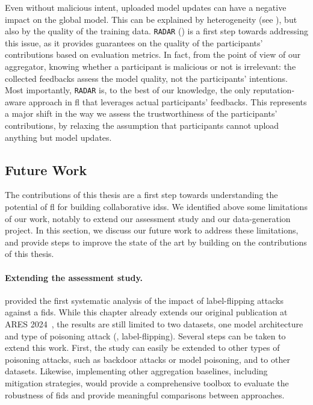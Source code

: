 \begin{itemize}[listparindent=\parindent,itemsep=.6\baselineskip]
  Even without malicious intent, uploaded model updates can have a negative impact on the global model.
  This can be explained by heterogeneity (see ), but also by the quality of the training data.
  \texttt{RADAR} () is a first step towards addressing this issue, as it provides guarantees on the quality of the participants' contributions based on evaluation metrics.
  In fact, from the point of view of our aggregator, knowing whether a participant is malicious or not is irrelevant: the collected feedbacks assess the model quality, not the participants' intentions.
  Most importantly, \texttt{RADAR} is, to the best of our knowledge, the only reputation-aware approach in \gls{fl} that leverages actual participants' feedbacks.
  This represents a major shift in the way we assess the trustworthiness of the participants' contributions, by relaxing the assumption that participants cannot upload anything but model updates.

\end{itemize}


\subsection{Future Work\label{sec:conclusion.future}}

The contributions of this thesis are a first step towards understanding the potential of \gls{fl} for building collaborative \glspl{ids}.
We identified above some limitations of our work, notably to extend our assessment study and our data-generation project.
In this section, we discuss our future work to address these limitations, and provide steps to improve the state of the art by building on the contributions of this thesis.


\paragraph{Extending the assessment study.}

 provided the first systematic analysis of the impact of label-flipping attacks against a \gls{fids}.
While this chapter already extends our original publication at ARES 2024~\cite{lavaur_ares_bass_2024}, the results are still limited to two datasets, one model architecture and type of poisoning attack (\ie, label-flipping).
Several steps can be taken to extend this work.
First, the study can easily be extended to other types of poisoning attacks, such as backdoor attacks or model poisoning, and to other datasets.
Likewise, implementing other aggregation baselines, including mitigation strategies, would provide a comprehensive toolbox to evaluate the robustness of \gls{fids} and provide meaningful comparisons between approaches.



